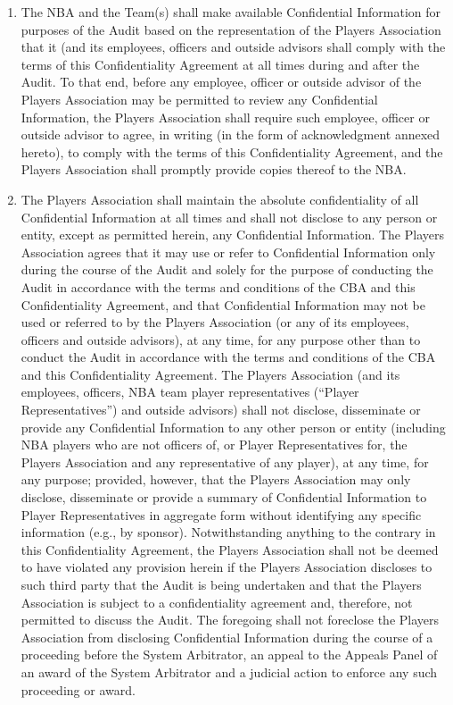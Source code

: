 \documentclass[
]{book}
\begin{document}
\begin{enumerate}
\def\labelenumi{\arabic{enumi}.}
\item
  The NBA and the Team(s) shall make available Confidential Information for purposes of the Audit based on the representation of the Players Association that it (and its employees, officers and outside advisors shall comply with the terms of this Confidentiality Agreement at all times during and after the Audit. To that end, before any employee, officer or outside advisor of the Players Association may be permitted to review any Confidential Information, the Players Association shall require such employee, officer or outside advisor to agree, in writing (in the form of acknowledgment annexed hereto), to comply with the terms of this Confidentiality Agreement, and the Players Association shall promptly provide copies thereof to the NBA.
\item
  The Players Association shall maintain the absolute confidentiality of all Confidential Information at all times and shall not disclose to any person or entity, except as permitted herein, any Confidential Information. The Players Association agrees that it may use or refer to Confidential Information only during the course of the Audit and solely for the purpose of conducting the Audit in accordance with the terms and conditions of the CBA and this Confidentiality Agreement, and that Confidential Information may not be used or referred to by the Players Association (or any of its employees, officers and outside advisors), at any time, for any purpose other than to conduct the Audit in accordance with the terms and conditions of the CBA and this Confidentiality Agreement. The Players Association (and its employees, officers, NBA team player representatives (``Player Representatives'') and outside advisors) shall not disclose, disseminate or provide any Confidential Information to any other person or entity (including NBA players who are not officers of, or Player Representatives for, the Players Association and any representative of any player), at any time, for any purpose; provided, however, that the Players Association may only disclose, disseminate or provide a summary of Confidential Information to Player Representatives in aggregate form without identifying any specific information (e.g., by sponsor). Notwithstanding anything to the contrary in this Confidentiality Agreement, the Players Association shall not be deemed to have violated any provision herein if the Players Association discloses to such third party that the Audit is being undertaken and that the Players Association is subject to a confidentiality agreement and, therefore, not permitted to discuss the Audit. The foregoing shall not foreclose the Players Association from disclosing Confidential Information during the course of a proceeding before the System Arbitrator, an appeal to the Appeals Panel of an award of the System Arbitrator and a judicial action to enforce any such proceeding or award.

\end{enumerate}
\end{document}
